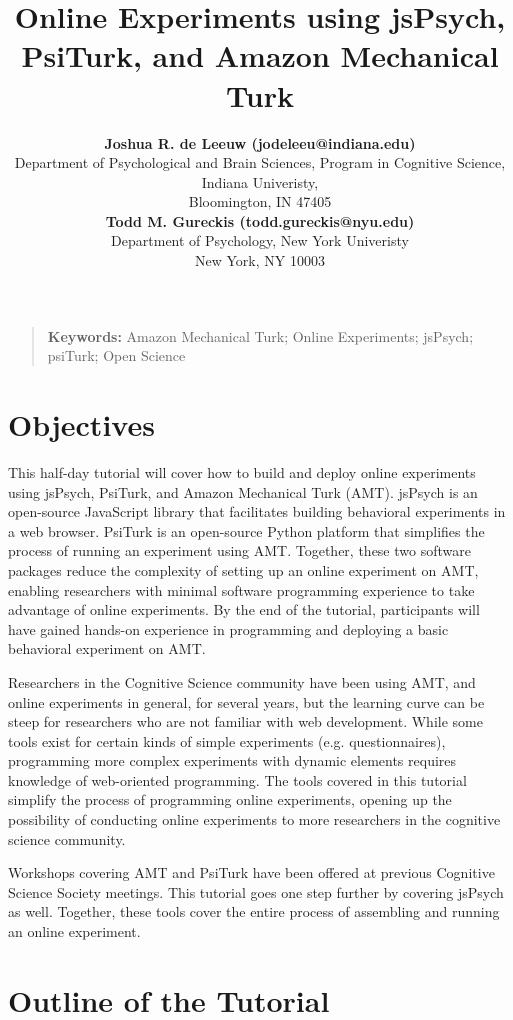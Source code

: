 \documentclass[10pt,letterpaper]{article}
\title{Online Experiments using jsPsych, PsiTurk, and Amazon Mechanical Turk}
\author{{\large \bf Joshua R. de Leeuw (jodeleeu@indiana.edu)} \\
  Department of Psychological and Brain Sciences,
  Program in Cognitive Science,
  Indiana Univeristy, \\
  Bloomington, IN 47405
  \AND {\large \bf Doug Markant (doug.markant@nyu.edu)} \\
  {\large \bf Todd M. Gureckis (todd.gureckis@nyu.edu)} \\
  Department of Psychology,
  New York Univeristy \\
  New York, NY 10003}
\begin{document}
\maketitle

\begin{quote}
\small
\textbf{Keywords:} 
Amazon Mechanical Turk; Online Experiments; jsPsych; psiTurk; Open Science
\end{quote}

\section{Objectives}

This half-day tutorial will cover how to build and deploy online experiments
using jsPsych, PsiTurk, and Amazon Mechanical Turk (AMT). jsPsych is an open-source JavaScript library that facilitates building behavioral experiments in a web browser. PsiTurk is an open-source Python platform that simplifies the process of running an experiment using AMT. Together, these two software packages reduce the complexity of setting up an online experiment on AMT, enabling researchers with minimal software programming experience to take advantage of online experiments. By the end of the tutorial, participants will have gained hands-on experience in programming and deploying a basic behavioral experiment on AMT.

Researchers in the Cognitive Science community have been using AMT, and online experiments in general, for several years, but the learning curve can be steep for researchers who are not familiar with web development. While some tools exist for certain kinds of simple experiments (e.g. questionnaires), programming more complex experiments with dynamic elements requires knowledge of web-oriented programming. The tools covered in this tutorial simplify the process of programming online experiments, opening up the possibility of conducting online experiments to more researchers in the cognitive science community.

Workshops covering AMT \cite{mason2011use} and PsiTurk \cite{coenen2013using} have been offered at previous Cognitive Science Society meetings. This tutorial goes one step further by covering jsPsych as well. Together, these tools cover the entire process of assembling and running an online experiment.

\section{Outline of the Tutorial}
\end{document}
